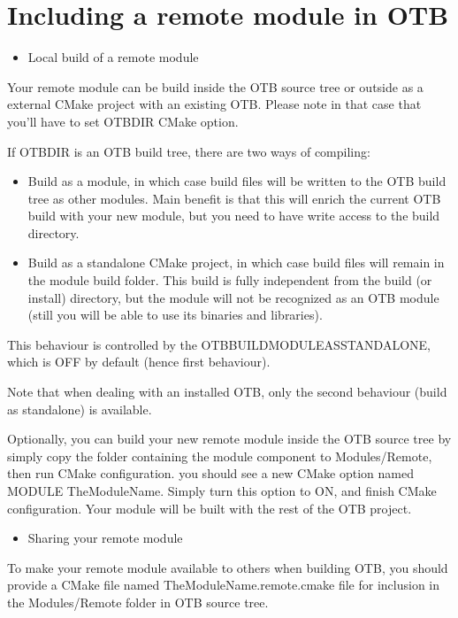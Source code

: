 \section{Including a remote module in OTB}
\begin{itemize}
       \item Local build of a remote module
\end{itemize}

Your remote module can be build inside the OTB source tree or outside as a
external CMake project with an existing OTB. Please note in that case
that you'll have to set OTB\textunderscore DIR CMake option.

If OTB\textunderscore DIR is an OTB build tree, there are two ways of compiling:
\begin{itemize}
  \item Build as a module, in which case build files will be written
    to the OTB build tree as other modules. Main benefit is that this
    will enrich the current OTB build with your new module, but you
    need to have write access to the build directory.
  \item Build as a standalone CMake project, in which case build files
    will remain in the module build folder. This build is fully
    independent from the build (or install) directory, but the module
    will not be recognized as an OTB module (still you will be able to
    use its binaries and libraries).
\end{itemize}

This behaviour is controlled by the OTB\textunderscore BUILD\textunderscore MODULE\textunderscore AS\textunderscore STANDALONE, which is OFF by default (hence first behaviour).

Note that when dealing with an installed OTB, only the second behaviour (build as standalone) is available.

Optionally, you can build your new remote module inside the OTB source tree by simply copy
the folder containing the module component to Modules/Remote, then run CMake
configuration. you should see a new CMake option named MODULE\textunderscore
TheModuleName. Simply turn this option to ON, and finish CMake
configuration. Your module will be built with the rest of the OTB project.

\begin{itemize}
       \item  Sharing your remote module
\end{itemize}

To make your remote module available to others when building OTB, you should
provide a CMake file named TheModuleName.remote.cmake file for inclusion in the
Modules/Remote folder in OTB source tree.

